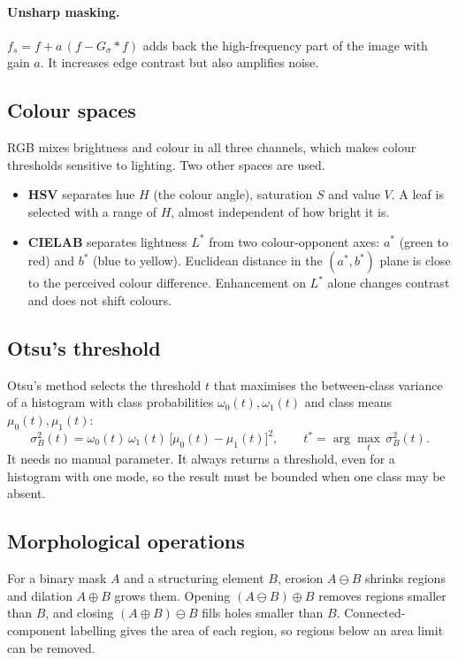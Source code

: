 \paragraph{Unsharp masking.} $f_s = f + a\,(f - G_\sigma * f)$ adds back the high-frequency part of the image with gain $a$. It increases edge contrast but also amplifies noise.

\subsection{Colour spaces}
RGB mixes brightness and colour in all three channels, which makes colour thresholds sensitive to lighting. Two other spaces are used.
\begin{itemize}[nosep]
\item \textbf{HSV} separates hue $H$ (the colour angle), saturation $S$ and value $V$. A leaf is selected with a range of $H$, almost independent of how bright it is.
\item \textbf{CIELAB} separates lightness $L^*$ from two colour-opponent axes: $a^*$ (green to red) and $b^*$ (blue to yellow). Euclidean distance in the $(a^*,b^*)$ plane is close to the perceived colour difference. Enhancement on $L^*$ alone changes contrast and does not shift colours.
\end{itemize}

\subsection{Otsu's threshold}
Otsu's method \cite{otsu1979} selects the threshold $t$ that maximises the between-class variance of a histogram with class probabilities $\omega_0(t),\omega_1(t)$ and class means $\mu_0(t),\mu_1(t)$:
\begin{equation}
\sigma_B^2(t) = \omega_0(t)\,\omega_1(t)\,\bigl[\mu_0(t) - \mu_1(t)\bigr]^2,
\qquad t^{*} = \arg\max_t\, \sigma_B^2(t).
\end{equation}
It needs no manual parameter. It always returns a threshold, even for a histogram with one mode, so the result must be bounded when one class may be absent.

\subsection{Morphological operations}
For a binary mask $A$ and a structuring element $B$, erosion $A\ominus B$ shrinks regions and dilation $A\oplus B$ grows them. Opening $(A\ominus B)\oplus B$ removes regions smaller than $B$, and closing $(A\oplus B)\ominus B$ fills holes smaller than $B$. Connected-component labelling gives the area of each region, so regions below an area limit can be removed.

